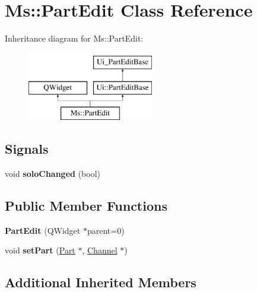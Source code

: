 \hypertarget{class_ms_1_1_part_edit}{}\section{Ms\+:\+:Part\+Edit Class Reference}
\label{class_ms_1_1_part_edit}
Inheritance diagram for Ms\+:\+:Part\+Edit\+:\begin{figure}[H]
\begin{center}
\leavevmode
\includegraphics[height=3.000000cm]{class_ms_1_1_part_edit}
\end{center}
\end{figure}
\subsection*{Signals}
\begin{DoxyCompactItemize}
\item 
\mbox{\label{class_ms_1_1_part_edit_aaaa404747cb11e77f77995ebdda8ca48}} 
void {\bfseries solo\+Changed} (bool)
\end{DoxyCompactItemize}
\subsection*{Public Member Functions}
\begin{DoxyCompactItemize}
\item 
\mbox{\label{class_ms_1_1_part_edit_a0c8e05af92ee03110815167ceb83974d}} 
{\bfseries Part\+Edit} (Q\+Widget $\ast$parent=0)
\item 
\mbox{\label{class_ms_1_1_part_edit_a73306c700bcc2323af1fcf80fc6a3c1e}} 
void {\bfseries set\+Part} (\hyperlink{class_ms_1_1_part}{Part} $\ast$, \hyperlink{struct_ms_1_1_channel}{Channel} $\ast$)
\end{DoxyCompactItemize}
\subsection*{Additional Inherited Members}


